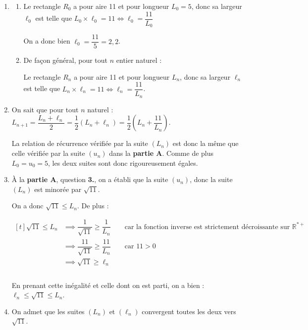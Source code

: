 \documentclass[10pt]{article}
\providecommand{\R}{\mathbb{R}}
\begin{document}
\begin{enumerate}
\item 
	\begin{enumerate}
		\item Le rectangle $R_0$ a pour aire 11 et pour longueur $L_0 = 5$, donc sa largeur $\ell_{0}$ est telle que $L_0 \times \ell_0 = 11 \iff \ell_0 = \dfrac{11}{L_0}$

On a donc bien $\ell_{0}=\dfrac{11}{5} = 2,2$.

		\item De façon général, pour tout $n$ entier naturel :

		Le rectangle $R_n$ a pour aire 11 et pour longueur $L_n$, donc sa largeur $\ell_{n}$ est telle que $L_n \times \ell_n = 11 \iff \ell_n = \dfrac{11}{L_n}$.

	\end{enumerate}
\item On sait que pour tout $n$ naturel : $L_{n+1} = \dfrac{L_n + \ell_n}{2} = \dfrac{1}{2}\left(L_n + \ell_n\right)  = \dfrac{1}{2}\left(L_n + \dfrac{11}{L_n}\right)$.

La relation de récurrence vérifiée par la suite $(L_n)$ est donc la même que celle vérifiée par la suite $(u_n)$ dans la \textbf{partie A}. Comme de plus $L_0 = u_0 = 5$, les deux suites sont donc rigoureusement égales.
	\item À la \textbf{partie A}, question \textbf{3.}, on a établi que la suite $(u_n)$, donc la suite $(L_n)$ est minorée par $\sqrt{11}$.

On a donc $\sqrt{11}\leqslant L_n$. De plus :

$\begin{aligned}[t] \sqrt{11}\leqslant L_n &\implies \dfrac{1}{\sqrt{11}} \geqslant \dfrac{1}{L_n} \qquad\text{car la fonction inverse est strictement décroissante sur }\R^{*+}\\
&\implies \dfrac{11}{\sqrt{11}} \geqslant \dfrac{11}{L_n} \qquad \text{car } 11>0\\
&\implies \sqrt{11}\geqslant\ell_n\\
\\ \end{aligned}$

En prenant cette inégalité et celle dont on est parti, on a bien : $\ell_n \leqslant\sqrt{11} \leqslant L_n$.

\item On admet que les suites $\left(L_{n}\right)$ et $\left(\ell_{n}\right)$ convergent toutes les deux vers $\sqrt{11}$.


\end{enumerate}
\end{document}
